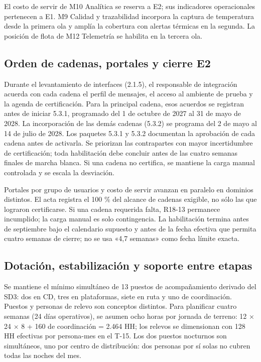 El costo de servir de M10 Analítica se reserva a E2; sus indicadores operacionales pertenecen a E1. M9 Calidad y trazabilidad incorpora la captura de temperatura desde la primera ola y amplía la cobertura con alertas térmicas en la segunda. La posición de flota de M12 Telemetría se habilita en la tercera ola.

\subsection{Orden de cadenas, portales y cierre E2}

Durante el levantamiento de interfaces (2.1.5), el responsable de integración acuerda con cada cadena el perfil de mensajes, el acceso al ambiente de prueba y la agenda de certificación. Para la principal cadena, esos acuerdos se registran antes de iniciar 5.3.1, programado del 1 de octubre de 2027 al 31 de mayo de 2028. La incorporación de las demás cadenas (5.3.2) se programa del 2 de mayo al 14 de julio de 2028. Los paquetes 5.3.1 y 5.3.2 documentan la aprobación de cada cadena antes de activarla. Se priorizan las contrapartes con mayor incertidumbre de certificación; toda habilitación debe concluir antes de las cuatro semanas finales de marcha blanca. Si una cadena no certifica, se mantiene la carga manual controlada y se escala la desviación.

Portales por grupo de usuarios y costo de servir avanzan en paralelo en dominios distintos. El acta registra el 100 \% del alcance de cadenas exigible, no sólo las que lograron certificarse. Si una cadena requerida falta, R18-13 permanece incumplido; la carga manual es solo contingencia. La habilitación termina antes de septiembre bajo el calendario supuesto y antes de la fecha efectiva que permita cuatro semanas de cierre; no se usa «4,7 semanas» como fecha límite exacta.

\subsection{Dotación, estabilización y soporte entre etapas}

Se mantiene el mínimo simultáneo de 13 puestos de acompañamiento derivado del SD3: dos en CD, tres en plataformas, siete en ruta y uno de coordinación. Puestos y personas de relevo son conceptos distintos. Para planificar cuatro semanas (24 días operativos), se asumen ocho horas por jornada de terreno: 12 \ensuremath{\times} 24 \ensuremath{\times} 8 + 160 de coordinación = 2.464 HH; los relevos se dimensionan con 128 HH efectivas por persona-mes en el T-15. Los dos puestos nocturnos son simultáneos, uno por centro de distribución: dos personas por sí solas no cubren todas las noches del mes.

